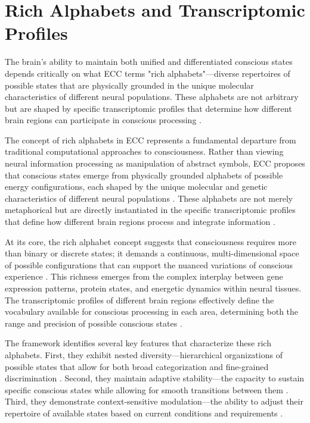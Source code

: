 \section{Rich Alphabets and Transcriptomic Profiles}

The brain's ability to maintain both unified and differentiated conscious states depends critically on what ECC terms "rich alphabets"—diverse repertoires of possible states that are physically grounded in the unique molecular characteristics of different neural populations. These alphabets are not arbitrary but are shaped by specific transcriptomic profiles that determine how different brain regions can participate in conscious processing \cite{tasic2018shared, siletti2023transcriptomic}.

The concept of rich alphabets in ECC represents a fundamental departure from traditional computational approaches to consciousness. Rather than viewing neural information processing as manipulation of abstract symbols, ECC proposes that conscious states emerge from physically grounded alphabets of possible energy configurations, each shaped by the unique molecular and genetic characteristics of different neural populations \cite{bakken2021comparative}. These alphabets are not merely metaphorical but are directly instantiated in the specific transcriptomic profiles that define how different brain regions process and integrate information \cite{hawrylycz2016inferring}.

At its core, the rich alphabet concept suggests that consciousness requires more than binary or discrete states; it demands a continuous, multi-dimensional space of possible configurations that can support the nuanced variations of conscious experience \cite{cembrowski2018continuous}. This richness emerges from the complex interplay between gene expression patterns, protein states, and energetic dynamics within neural tissues. The transcriptomic profiles of different brain regions effectively define the vocabulary available for conscious processing in each area, determining both the range and precision of possible conscious states \cite{lake2016neuronal}.

The framework identifies several key features that characterize these rich alphabets. First, they exhibit nested diversity—hierarchical organizations of possible states that allow for both broad categorization and fine-grained discrimination \cite{nowakowski2017spatiotemporal}. Second, they maintain adaptive stability—the capacity to sustain specific conscious states while allowing for smooth transitions between them \cite{raj2008nature}. Third, they demonstrate context-sensitive modulation—the ability to adjust their repertoire of available states based on current conditions and requirements \cite{lein2017promise}.

